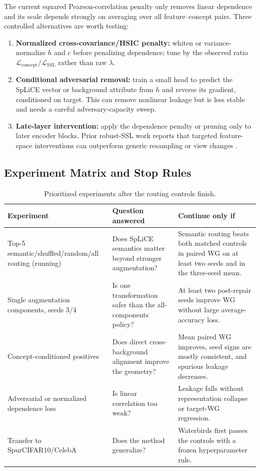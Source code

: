 \documentclass[11pt,a4paper]{article}
\begin{document}
The current squared Pearson-correlation penalty only removes linear dependence
and its scale depends strongly on averaging over all feature--concept pairs.
Three controlled alternatives are worth testing:
\begin{enumerate}
    \item \textbf{Normalized cross-covariance/HSIC penalty:} whiten or
    variance-normalize $h$ and $c$ before penalizing dependence; tune by the
    observed ratio $\mathcal L_{\mathrm{concept}}/\mathcal L_{\mathrm{SSL}}$
    rather than raw $\lambda$.
    \item \textbf{Conditional adversarial removal:} train a small head to
    predict the SpLiCE vector or background attribute from $h$ and reverse its
    gradient, conditioned on target. This can remove nonlinear leakage but is
    less stable and needs a careful adversary-capacity sweep.
    \item \textbf{Late-layer intervention:} apply the dependence penalty or
    pruning only to later encoder blocks. Prior robust-SSL work reports that
    targeted feature-space interventions can outperform generic resampling or
    view changes \cite{hamidieh2024views}.
\end{enumerate}

\subsection{Experiment Matrix and Stop Rules}

\begin{table}[ht]
\centering
\small
\caption{Prioritized experiments after the routing controls finish.}
\begin{tabularx}{\textwidth}{p{}p{}X}
\toprule
Experiment & Question answered & Continue only if \\
\midrule
Top-5 semantic/shuffled/random/all routing (running) & Does SpLiCE semantics
matter beyond stronger augmentation? & Semantic routing beats both matched
controls in paired WG on at least two seeds and in the three-seed mean. \\
Single augmentation components, seeds 3/4 & Is one transformation safer than
the all-components policy? & At least two post-repair seeds improve WG without
large average-accuracy loss. \\
Concept-conditioned positives & Does direct cross-background alignment improve
the geometry? & Mean paired WG improves, seed signs are mostly consistent, and
spurious leakage decreases. \\
Adversarial or normalized dependence loss & Is linear correlation too weak? &
Leakage falls without representation collapse or target-WG regression. \\
Transfer to SpurCIFAR10/CelebA & Does the method generalize? & Waterbirds first
passes the controls with a frozen hyperparameter rule. \\
\bottomrule
\end{tabularx}
\end{table}
\end{document}
